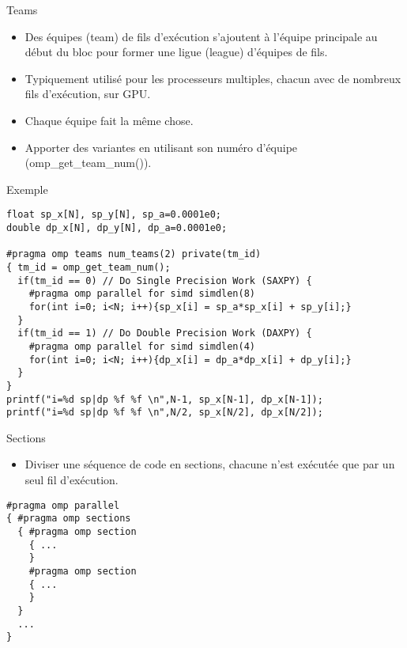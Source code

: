 \documentclass[10pt]{beamer}
\begin{document}
\begin{frame}[fragile]{Teams}

  \begin{itemize}
    \item Des équipes (team) de fils d'exécution s'ajoutent à l'équipe principale au début du bloc pour former une ligue (league) d'équipes de fils.

    \item Typiquement utilisé pour les processeurs multiples, chacun avec de nombreux fils d'exécution, sur GPU.

    \item Chaque équipe fait la même chose.

    \item Apporter des variantes en utilisant son numéro d'équipe (omp\_get\_team\_num()).
    
  \end{itemize}
\end{frame}

\begin{frame}[fragile]{Exemple}

  \scriptsize
  \begin{verbatim}
float sp_x[N], sp_y[N], sp_a=0.0001e0;
double dp_x[N], dp_y[N], dp_a=0.0001e0;

#pragma omp teams num_teams(2) private(tm_id)
{ tm_id = omp_get_team_num();
  if(tm_id == 0) // Do Single Precision Work (SAXPY) {
    #pragma omp parallel for simd simdlen(8)
    for(int i=0; i<N; i++){sp_x[i] = sp_a*sp_x[i] + sp_y[i];}
  }
  if(tm_id == 1) // Do Double Precision Work (DAXPY) {
    #pragma omp parallel for simd simdlen(4)
    for(int i=0; i<N; i++){dp_x[i] = dp_a*dp_x[i] + dp_y[i];}
  }
}
printf("i=%d sp|dp %f %f \n",N-1, sp_x[N-1], dp_x[N-1]);
printf("i=%d sp|dp %f %f \n",N/2, sp_x[N/2], dp_x[N/2]);
  \end{verbatim}
\end{frame}

\begin{frame}[fragile]{Sections}

  \begin{itemize}
    \item Diviser une séquence de code en sections, chacune n'est exécutée que par un seul fil d'exécution.
  \end{itemize}
  \begin{verbatim}
#pragma omp parallel
{ #pragma omp sections
  { #pragma omp section
    { ...
    }
    #pragma omp section
    { ...
    }
  }
  ...
}
  \end{verbatim}
\end{frame}
\end{document}
